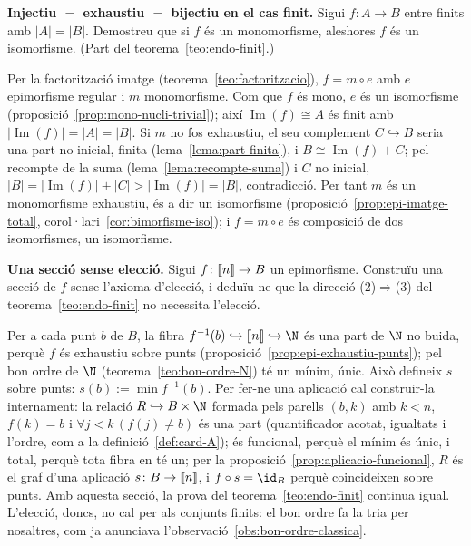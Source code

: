 \begin{exercici}
\textbf{Injectiu \(=\) exhaustiu \(=\) bijectiu en el cas finit.} Sigui \(f\colon A\to B\) entre finits amb \(|A|=|B|\). Demostreu que si \(f\) és un monomorfisme, aleshores \(f\) és un isomorfisme. (Part del teorema~\ref{teo:endo-finit}.)
\end{exercici}
\begin{solucio}
Per la factorització imatge (teorema~\ref{teo:factoritzacio}), \(f=m\circ e\) amb \(e\) epimorfisme regular i \(m\) monomorfisme. Com que \(f\) és mono, \(e\) és un isomorfisme (proposició~\ref{prop:mono-nucli-trivial}); així \(\operatorname{Im}(f)\cong A\) és finit amb \(|\operatorname{Im}(f)|=|A|=|B|\). Si \(m\) no fos exhaustiu, el seu complement \(C\hookrightarrow B\) seria una part no inicial, finita (lema~\ref{lema:part-finita}), i \(B\cong\operatorname{Im}(f)+C\); pel recompte de la suma (lema~\ref{lema:recompte-suma}) i \(C\) no inicial, \(|B|=|\operatorname{Im}(f)|+|C|>|\operatorname{Im}(f)|=|B|\), contradicció. Per tant \(m\) és un monomorfisme exhaustiu, és a dir un isomorfisme (proposició~\ref{prop:epi-imatge-total}, corol·lari~\ref{cor:bimorfisme-iso}); i \(f=m\circ e\) és composició de dos isomorfismes, un isomorfisme.
\end{solucio}

\begin{exercici}
\textbf{Una secció sense elecció.} Sigui \(f\colon\llbracket n\rrbracket\to B\) un epimorfisme. Construïu una secció de \(f\) sense l'axioma d'elecció, i deduïu-ne que la direcció (2)\(\Rightarrow\)(3) del teorema~\ref{teo:endo-finit} no necessita l'elecció.
\end{exercici}
\begin{solucio}
Per a cada punt \(b\) de \(B\), la fibra \(f^{-1}(b)\hookrightarrow\seg{n}\hookrightarrow\N\) és una part de \(\N\) no buida, perquè \(f\) és exhaustiu sobre punts (proposició~\ref{prop:epi-exhaustiu-punts}); pel bon ordre de \(\N\) (teorema~\ref{teo:bon-ordre-N}) té un mínim, únic. Això defineix \(s\) sobre punts: \(s(b):=\min f^{-1}(b)\). Per fer-ne una aplicació cal construir-la internament: la relació \(R\hookrightarrow B\times\N\) formada pels parells \((b,k)\) amb \(k<n\), \(f(k)=b\) i \(\forall j<k\,(f(j)\ne b)\) és una part (quantificador acotat, igualtats i l'ordre, com a la definició~\ref{def:card-A}); és funcional, perquè el mínim és únic, i total, perquè tota fibra en té un; per la proposició~\ref{prop:aplicacio-funcional}, \(R\) és el graf d'una aplicació \(s\colon B\to\llbracket n\rrbracket\), i \(f\circ s=\id_B\) perquè coincideixen sobre punts. Amb aquesta secció, la prova del teorema~\ref{teo:endo-finit} continua igual. L'elecció, doncs, no cal per als conjunts finits: el bon ordre fa la tria per nosaltres, com ja anunciava l'observació~\ref{obs:bon-ordre-classica}.
\end{solucio}

